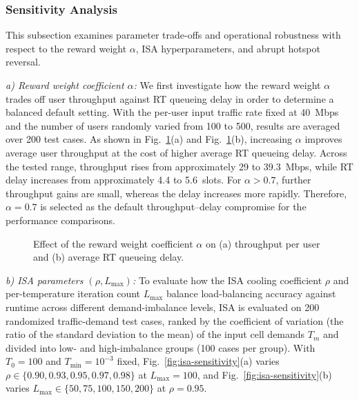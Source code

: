 \documentclass[journal]{IEEEtran}
\newcommand{\revbegin}[1]{\color{revisionblue}\ignorespaces}
\newcommand{\revend}[1]{\color{black}\ignorespaces}
\begin{document}
\begin{table}[!t]
\revbegin{}
\centering
\caption{Ablation Results at Different Per-User Input Rates}
\label{tab:ablation-performance}

\revend{}
\end{table}

\revbegin{}\subsubsection{Sensitivity Analysis}\revend{}
\revbegin{}This subsection examines parameter trade-offs and operational robustness with respect to the reward weight $\alpha$, ISA hyperparameters, and abrupt hotspot reversal.\revend{}

\revbegin{}\textit{a) Reward weight coefficient $\alpha$:}
We first investigate how the reward weight $\alpha$ trades off user throughput against RT queueing delay in order to determine a balanced default setting. With the per-user input traffic rate fixed at 40~Mbps and the number of users randomly varied from 100 to 500, results are averaged over 200 test cases. As shown in Fig.~\ref{fig:alpha-performance}(a) and Fig.~\ref{fig:alpha-performance}(b), increasing $\alpha$ improves average user throughput at the cost of higher average RT queueing delay. Across the tested range, throughput rises from approximately 29 to 39.3~Mbps, while RT delay increases from approximately 4.4 to 5.6~slots. For $\alpha>0.7$, further throughput gains are small, whereas the delay increases more rapidly. Therefore, $\alpha=0.7$ is selected as the default throughput--delay compromise for the performance comparisons.\revend{}

\begin{figure}[!t]
\centering

\revbegin{}\caption{Effect of the reward weight coefficient $\alpha$ on (a) throughput per user and (b) average RT queueing delay.}\revend{}
\label{fig:alpha-performance}
\end{figure}

\revbegin{}\textit{b) ISA parameters $(\rho, L_{\max})$:}
To evaluate how the ISA cooling coefficient $\rho$ and per-temperature iteration count $L_{\max}$ balance load-balancing accuracy against runtime across different demand-imbalance levels, ISA is evaluated on 200 randomized traffic-demand test cases, ranked by the coefficient of variation (the ratio of the standard deviation to the mean) of the input cell demands $T_m$ and divided into low- and high-imbalance groups (100 cases per group). With~$T_0=100$ and $T_{\min}=10^{-3}$ fixed, Fig.~\ref{fig:isa-sensitivity}(a) varies $\rho\in\{0.90,0.93,0.95,0.97,0.98\}$ at $L_{\max}=100$, and Fig.~\ref{fig:isa-sensitivity}(b) varies $L_{\max}\in\{50,75,100,150,200\}$ at $\rho=0.95$.\revend{}
\end{document}
